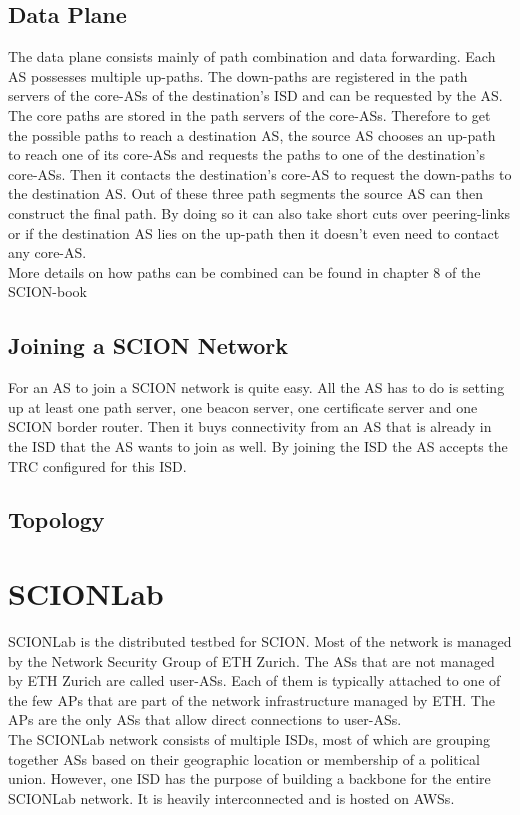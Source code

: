 \subsection{Data Plane}
The data plane consists mainly of path combination and data forwarding. Each \acs{AS} possesses multiple up-paths. The down-paths are registered in the path servers of the core-\acsp{AS} of the destination's \acs{ISD} and can be requested by the \acs{AS}. The core paths are stored in the path servers of the core-\acsp{AS}. Therefore to get the possible paths to reach a destination \acs{AS}, the source \acs{AS} chooses an up-path to reach one of its core-\acsp{AS} and requests the paths to one of the destination's core-\acsp{AS}. Then it contacts the destination's core-\acs{AS} to request the down-paths to the destination \acs{AS}. Out of these three path segments the source \acs{AS} can then construct the final path. By doing so it can also take short cuts over peering-links or if the destination \acs{AS} lies on the up-path then it doesn't even need to contact any core-\acs{AS}.
\\
More details on how paths can be combined can be found in chapter 8 of the \acs{SCION}-book \cite{perrig2017scion}

\subsection{Joining a SCION Network}
For an \acs{AS} to join a \acs{SCION} network is quite easy. All the \acs{AS} has to do is setting up at least one path server, one beacon server, one certificate server and one \acs{SCION} border router. Then it buys connectivity from an AS that is already in the \acs{ISD} that the \acs{AS} wants to join as well. By joining the \acs{ISD} the \acs{AS} accepts the \acs{TRC} configured for this \acs{ISD}.

\subsection{Topology}

\section{SCIONLab}
\acs{SCIONLab} is the distributed testbed for \acs{SCION}. Most of the network is managed by the Network Security Group of \acs{ETH} Zurich. The \acsp{AS} that are not managed by \acs{ETH} Zurich are called user-\acsp{AS}. Each of them is typically attached to one of the few \aclp{AP} that are part of the network infrastructure managed by \acs{ETH}. The \acsp{AP} are the only \acsp{AS} that allow direct connections to user-\acsp{AS}.
\\
The \acs{SCIONLab} network consists of multiple \acsp{ISD}, most of which are grouping together \acsp{AS} based on their geographic location or membership of a political union. However, one \acs{ISD} has the purpose of building a backbone for the entire \acs{SCIONLab} network. It is heavily interconnected and is hosted on \aclp{AWS}.

